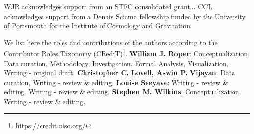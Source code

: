 \documentclass[fleqn,usenatbib]{mnras}
\begin{document}
WJR acknowledges support from an STFC consolidated grant... 
CCL acknowledges support from a Dennis Sciama fellowship funded by the University of Portsmouth for the Institute of Cosmology and Gravitation.

We list here the roles and contributions of the authors according to the Contributor Roles Taxonomy (CRediT)\footnote{\url{https://credit.niso.org/}}.
\textbf{William J. Roper}: Conceptualization, Data curation, Methodology, Investigation, Formal Analysis, Visualization, Writing - original draft.
\textbf{Christopher C. Lovell, Aswin P. Vijayan}: Data curation, Writing - review \& editing.
\textbf{Louise Seeyave}: Writing - review \& editing.
Writing - review \& editing.
\textbf{Stephen M. Wilkins}: Conceptualization, Writing - review \& editing.











\bsp	%
\label{lastpage}
\end{document}
